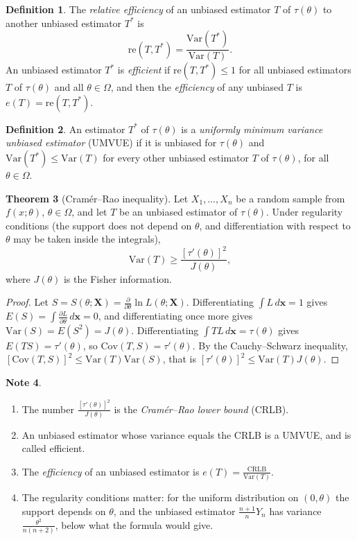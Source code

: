 \documentclass[12pt,a4paper]{report}
\theoremstyle{definition}
\newtheorem{thm}{Theorem}[section]
\newtheorem{definition}[thm]{Definition}
\newtheorem{note}[thm]{Note}
\theoremstyle{plain}
\begin{document}
\begin{definition}
\label{def:efficiency}
The \emph{relative efficiency} of an unbiased estimator $T$ of $\tau(\theta)$ to
another unbiased estimator $T^*$ is
\[\text{re}(T,T^{*}) = \frac{\text{Var}(T^*)}{\text{Var}(T)} .\]
An unbiased estimator $T^*$ is \emph{efficient} if $\text{re}(T,T^*) \leq 1$ for
all unbiased estimators $T$ of $\tau(\theta)$ and all $\theta \in \Omega$, and then
the \emph{efficiency} of any unbiased $T$ is $e(T) = \text{re}(T,T^*)$.
\end{definition}

\begin{definition}
\label{def:umvue}
An estimator $T^*$ of $\tau(\theta)$ is a \emph{uniformly minimum variance
unbiased estimator} (UMVUE) if it is unbiased for $\tau(\theta)$ and
$\text{Var}(T^*) \leq \text{Var}(T)$ for every other unbiased estimator $T$ of
$\tau(\theta)$, for all $\theta \in \Omega$.
\end{definition}

\begin{thm}[Cram\'er--Rao inequality]
\label{thm:cramerrao}
Let $X_1, \dots, X_n$ be a random sample from $f(x;\theta)$, $\theta \in
\Omega$, and let $T$ be an unbiased estimator of $\tau(\theta)$. Under regularity
conditions (the support does not depend on $\theta$, and differentiation with
respect to $\theta$ may be taken inside the integrals),
\[\text{Var}(T)\geq \frac{\left[\tau'(\theta)\right]^2}{J(\theta)} ,\]
where $J(\theta)$ is the Fisher information.
\end{thm}

\begin{proof}
Let $S = S(\theta;\mathbf X) = \frac{\partial}{\partial\theta}\ln L(\theta;\mathbf
X)$. Differentiating $\int L\,d\mathbf x = 1$ gives $E(S) = \int\frac{\partial
L}{\partial\theta}\,d\mathbf x = 0$, and differentiating once more gives
$\text{Var}(S) = E(S^2) = J(\theta)$. Differentiating $\int T L\,d\mathbf x =
\tau(\theta)$ gives $E(TS) = \tau'(\theta)$, so
$\text{Cov}(T,S) = \tau'(\theta)$. By the Cauchy--Schwarz inequality,
$\left[\text{Cov}(T,S)\right]^2\leq\text{Var}(T)\text{Var}(S)$, that is
$[\tau'(\theta)]^2\leq\text{Var}(T)J(\theta)$.
\end{proof}

\begin{note}
\begin{enumerate}
\item The number $\frac{[\tau'(\theta)]^2}{J(\theta)}$ is the \emph{Cram\'er--Rao
lower bound} (CRLB).
\item An unbiased estimator whose variance equals the CRLB is a UMVUE, and is
called efficient.
\item The \emph{efficiency} of an unbiased estimator is
$e(T) = \frac{\text{CRLB}}{\text{Var}(T)}$.
\item The regularity conditions matter: for the uniform distribution on
$(0,\theta)$ the support depends on $\theta$, and the unbiased estimator
$\frac{n + 1}{n}Y_n$ has variance $\frac{\theta^2}{n(n + 2)}$, below what the
formula would give.
\end{enumerate}
\end{note}
\end{document}
